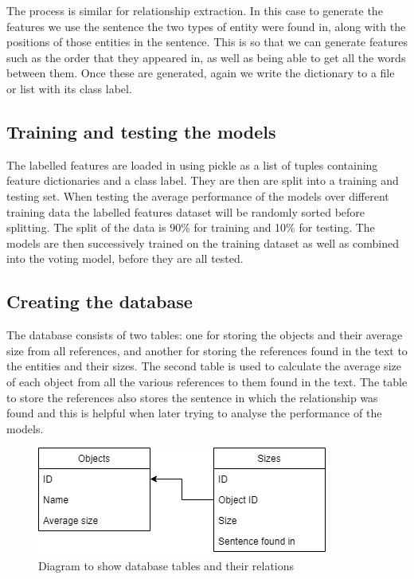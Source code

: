 \documentclass[11pt,oneside]{book}
\begin{document}
The process is similar for relationship extraction. In this case to generate the features we use the sentence the two types of entity were found in, along with the positions of those entities in the sentence. This is so that we can generate features such as the order that they appeared in, as well as being able to get all the words between them. Once these are generated, again we write the dictionary to a file or list with its class label.

\subsection{Training and testing the models}
The labelled features are loaded in using pickle as a list of tuples containing feature dictionaries and a class label. They are then are split into a training and testing set. When testing the average performance of the models over different training data the labelled features dataset will be randomly sorted before splitting. The split of the data is 90\% for training and 10\% for testing. The models are then successively trained on the training dataset as well as combined into the voting model, before they are all tested.

\subsection{Creating the database}
The database consists of two tables: one for storing the objects and their average size from all references, and another for storing the references found in the text to the entities and their sizes. The second table is used to calculate the average size of each object from all the various references to them found in the text. The table to store the references also stores the sentence in which the relationship was found and this is helpful when later trying to analyse the performance of the models.

\begin{figure}[!htbp]
\centering
\includegraphics[scale=0.7]{figures/DatabaseDiagram.png}
\caption{Diagram to show database tables and their relations}
\label{fig:model_flow}
\end{figure}
\end{document}
